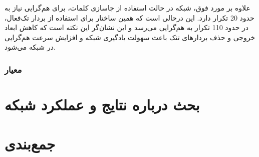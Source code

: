 علاوه بر مورد فوق، شبکه در حالت استفاده از جاسازی کلمات، برای هم‌گرایی نیاز به حدود 20 تکرار دارد. این درحالی است که همین ساختار برای استفاده از بردار تک‌فعال، در حدود 110 تکرار به هم‌گرایی می‌رسد و این نشان‌گر این نکته است که کاهش ابعاد خروجی و حذف بردارهای تنک باعث سهولت یادگیری شبکه و افزایش سرعت هم‌گرایی در شبکه می‌شود.

\subsubsection{معیار }

\section{بحث درباره نتایج و عملکرد شبکه}

\section{جمع‌بندی}













